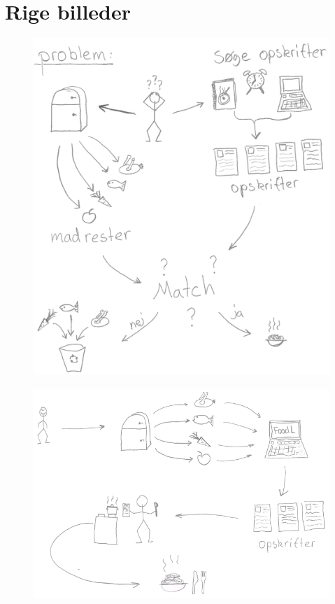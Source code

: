 \chapter{Rige billeder}
\label{ap:rigebilleder}

\begin{figure}
\centering
\includegraphics[scale=0.6]{billeder/rigebilleder/problemomraade.png}
\label{fig:rigbillede_po}
\end{figure}

\begin{figure}
\centering
\includegraphics[scale=0.6]{billeder/rigebilleder/anvendelsesomraade.png}
\label{fig:rigbillede_ao}
\end{figure}
